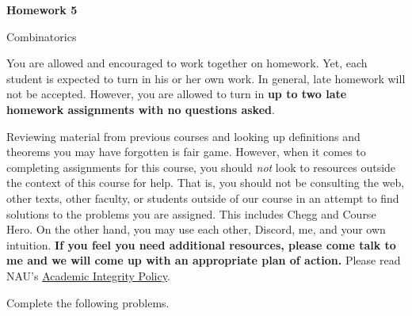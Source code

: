 \documentclass[11pt]{article}%
\theoremstyle{definition}
\newcommand{\blankline}{\pagebreak[2]\vspace{.5\baselineskip}}
\begin{document}
\begin{center}
{\Large\bf Homework 5}

\smallskip

Combinatorics
\end{center}

\thispagestyle{fancy}

You are allowed and encouraged to work together on homework. Yet, each student is expected to turn in his or her own work. In general, late homework will not be accepted. However, you are allowed to turn in \textbf{up to two late homework assignments with no questions asked}. 

\blankline

Reviewing material from previous courses and looking up definitions and theorems you may have forgotten is fair game. However, when it comes to completing assignments for this course, you should \emph{not} look to resources outside the context of this course for help.  That is, you should not be consulting the web, other texts, other faculty, or students outside of our course in an attempt to find solutions to the problems you are assigned.  This includes Chegg and Course Hero. On the other hand, you may use each other, Discord, me, and your own intuition. \textbf{If you feel you need additional resources, please come talk to me and we will come up with an appropriate plan of action.} Please read NAU's \href{https://www5.nau.edu/policies/Client/Details/828?whoIsLooking=Students&pertainsTo=All&sortDirection=Ascending&page=1}{Academic Integrity Policy}.

\blankline

Complete the following problems. 
\end{document}
